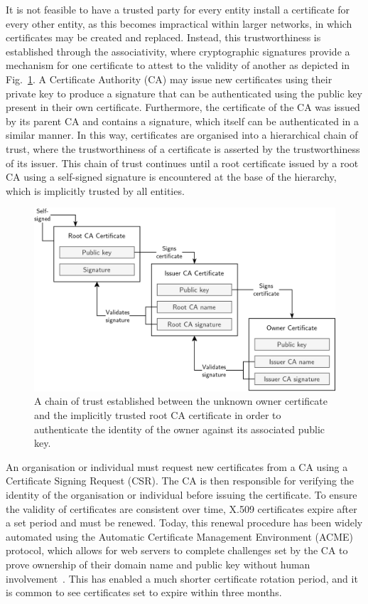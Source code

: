 It is not feasible to have a trusted party for every entity install a certificate for every other entity, as this becomes impractical within larger networks, in which certificates may be created and replaced. Instead, this trustworthiness is established through the associativity, where cryptographic signatures provide a mechanism for one certificate to attest to the validity of another as depicted in Fig.~\ref{tls_chain_figure}. A Certificate Authority (CA) may issue new certificates using their private key to produce a signature that can be authenticated using the public key present in their own certificate. Furthermore, the certificate of the CA was issued by its parent CA and contains a signature, which itself can be authenticated in a similar manner. In this way, certificates are organised into a hierarchical chain of trust, where the trustworthiness of a certificate is asserted by the trustworthiness of its issuer. This chain of trust continues until a root certificate issued by a root CA using a self-signed signature is encountered at the base of the hierarchy, which is implicitly trusted by all entities.

\begin{figure}[ht]
\centerline{\includegraphics[width=160mm]{images/tls-chain.png}}
\caption[TLS certificate chain of trust]{A chain of trust established between the unknown owner certificate and the implicitly trusted root CA certificate in order to authenticate the identity of the owner against its associated public key.}
\label{tls_chain_figure}
\end{figure}

An organisation or individual must request new certificates from a CA using a Certificate Signing Request (CSR). The CA is then responsible for verifying the identity of the organisation or individual before issuing the certificate. To ensure the validity of certificates are consistent over time, X.509 certificates expire after a set period and must be renewed. Today, this renewal procedure has been widely automated using the Automatic Certificate Management Environment (ACME) protocol, which allows for web servers to complete challenges set by the CA to prove ownership of their domain name and public key without human involvement~\cite{rfc8555}. This has enabled a much shorter certificate rotation period, and it is common to see certificates set to expire within three months.

